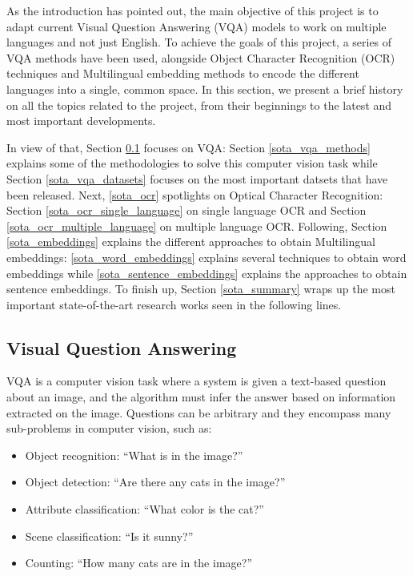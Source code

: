 As the introduction has pointed out, the main objective of this project is to adapt current Visual Question Answering (VQA) models to  work on multiple languages and not just English.  To achieve the goals of this project, a series of VQA methods have been used, alongside Object Character Recognition (OCR) techniques and Multilingual embedding methods to encode the different languages into a single, common space.  In this section, we present a brief history on all the topics related to the project, from their beginnings to the latest and most important developments.  

In view of that, Section \ref{sota_vqa} focuses on VQA: Section \ref{sota_vqa_methods} explains some of the methodologies to solve this computer vision task while Section \ref{sota_vqa_datasets} focuses on the most important datsets that have been released. Next, \ref{sota_ocr} spotlights on Optical Character Recognition: Section \ref{sota_ocr_single_language} on single language OCR and Section \ref{sota_ocr_multiple_language} on multiple language OCR.  Following, Section \ref{sota_embeddings} explains the different approaches to obtain Multilingual embeddings: \ref{sota_word_embeddings} explains several techniques to obtain word embeddings while \ref{sota_sentence_embeddings} explains the approaches to obtain sentence embeddings. To finish up, Section \ref{sota_summary} wraps up the most important state-of-the-art research works seen in the following lines.


\subsection{Visual Question Answering}
\label{sota_vqa}
VQA is a computer vision task where a system is given a text-based question about an image,  and the algorithm must infer the answer based on information extracted on the image.  Questions can be arbitrary and they encompass many sub-problems in computer vision, such as:

\begin{itemize}
	\item Object recognition: “What is in the image?”
	\item Object detection: “Are there any cats in the image?”
	\item Attribute classification: “What color is the cat?”
	\item Scene classification: “Is it sunny?”
	\item Counting: “How many cats are in the image?”
\end{itemize}

